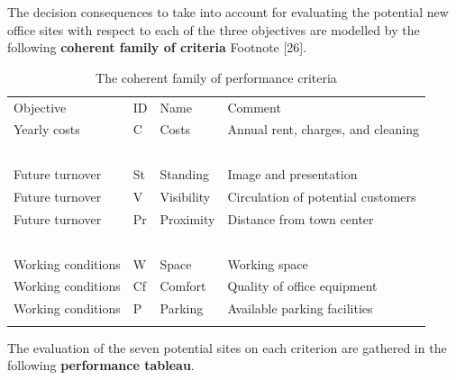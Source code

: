 The decision consequences to take into account for evaluating the potential new office sites with respect to each of the three objectives are modelled by the following \textbf{coherent family of criteria} Footnote [26].

\begin{table}[h]
\caption{The coherent family of performance criteria}
\label{tab:6.2}       %
\begin{center}
    \begin{tabular}{l|l|l|l}
      \hline\noalign{\smallskip}
      Objective & ID & Name &  Comment\\
      \noalign{\smallskip}\hline\noalign{\smallskip}
    Yearly costs  &       C &   Costs &       Annual rent, charges, and cleaning\\
    \             &  \      & \        &  \ \\
    Future turnover   &   St &   Standing &    Image and presentation\\
    Future turnover   &   V  &  Visibility &  Circulation of potential customers \\
    Future turnover   &   Pr  & Proximity  &  Distance from town center\\
    \                 &   \   & \          &  \  \\
    Working conditions &  W  &  Space   &     Working space\\
    Working conditions &  Cf &  Comfort  &    Quality of office equipment\\
    Working conditions &  P  &  Parking  &    Available parking facilities\\
      \noalign{\smallskip}\hline
    \end{tabular}   
  \end{center}
\end{table}

The evaluation of the seven potential sites on each criterion are gathered in the following \textbf{performance tableau}.

